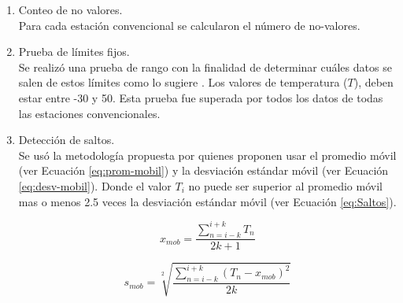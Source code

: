%		
%
\begin{enumerate}


	\item Conteo de no valores.\\
	Para cada estación convencional se calcularon el número de no-valores.
    
    \item Prueba de límites fijos.\\
	Se realizó una prueba de rango con la finalidad de determinar cuáles datos se salen de estos límites como lo sugiere \citet{estevez2011}. Los valores de temperatura ($T$), deben estar entre -30 y 50\celc. Esta prueba fue superada por todos los datos de todas las estaciones convencionales.


	\item Detección de saltos.\\
	Se usó la metodología propuesta por \citet{vickers1997} quienes proponen usar el promedio móvil (ver Ecuación \ref{eq:prom-mobil}) y la desviación estándar móvil (ver Ecuación \ref{eq:desv-mobil}). Donde el valor $T_i$ no puede ser superior al promedio móvil mas o menos 2.5 veces la desviación estándar móvil (ver Ecuación \ref{eq:Saltos}).

	
	
\begin{equation}\label{eq:prom-mobil}
    x_{mob} = \frac{\sum\limits_{n=i-k}^{i+k} T_{n}}{2k + 1}
\end{equation}

\begin{equation}\label{eq:desv-mobil}
s_{mob} = \sqrt[2]{\frac{\sum\limits_{n=i-k}^{i+k} (T_{n} - x_{mob})^2}{2k}} 
\end{equation}
 

\end{enumerate}
